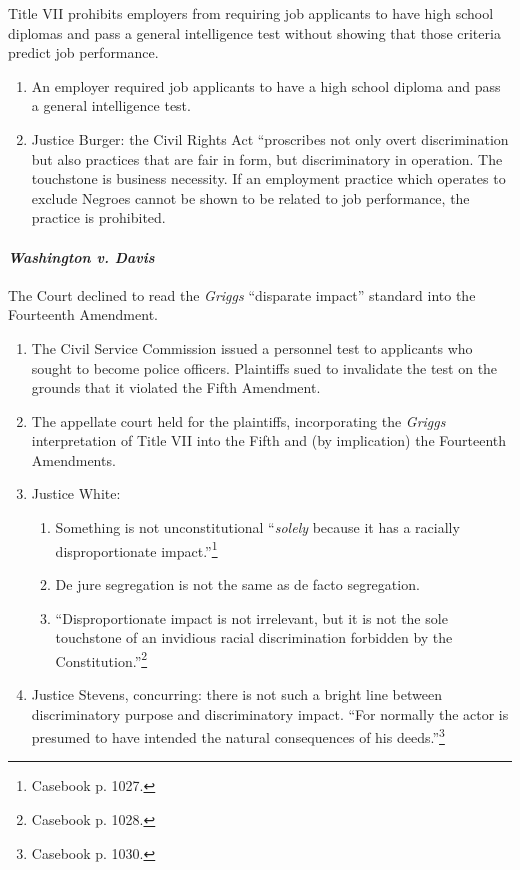 Title VII prohibits employers from requiring job applicants to have high 
school diplomas and pass a general intelligence test without showing that 
those criteria predict job performance.

\begin{enumerate}
    \item An employer required job applicants to have a high school diploma 
    and pass a general intelligence test.
    \item Justice Burger: the Civil Rights Act ``proscribes not only overt 
    discrimination but also practices that are fair in form, but 
    discriminatory in operation. The touchstone is business necessity. If an 
    employment practice which operates to exclude Negroes cannot be shown to 
    be related to job performance, the practice is prohibited.
\end{enumerate}

\paragraph{\emph{Washington v. Davis}}

The Court declined to read the \emph{Griggs} ``disparate impact'' standard 
into the Fourteenth Amendment.

\begin{enumerate}
    \item The Civil Service Commission issued a personnel test to applicants 
    who sought to become police officers. Plaintiffs sued to invalidate the 
    test on the grounds that it violated the Fifth Amendment.
    \item The appellate court held for the plaintiffs, incorporating the 
    \emph{Griggs} interpretation of Title VII into the Fifth and (by 
    implication) the Fourteenth Amendments.
    \item Justice White:
    \begin{enumerate}
        \item Something is not unconstitutional ``\emph{solely} because it has 
        a racially disproportionate impact.''\footnote{Casebook p. 1027.}
        \item De jure segregation is not the same as de facto segregation.
        \item ``Disproportionate impact is not irrelevant, but it is not the 
        sole touchstone of an invidious racial discrimination forbidden by the 
        Constitution.''\footnote{Casebook p. 1028.}
    \end{enumerate}
    \item Justice Stevens, concurring: there is not such a bright line between 
    discriminatory purpose and discriminatory impact. ``For normally the actor 
    is presumed to have intended the natural consequences of his 
    deeds.''\footnote{Casebook p. 1030.}
\end{enumerate}


